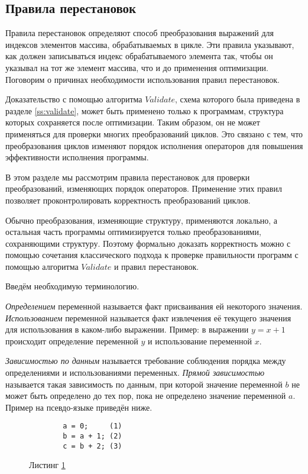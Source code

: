 \subsection{Правила перестановок}

Правила перестановок определяют способ преобразования выражений для индексов элементов массива, обрабатываемых в цикле. Эти правила указывают, как должен записываться индекс обрабатываемого элемента так, чтобы он указывал на тот же элемент массива, что и до применения оптимизации. Поговорим о причинах необходимости использования правил перестановок.

Доказательство с помощью алгоритма $Validate$, схема которого была приведена в разделе \ref{ss:validate}, может быть применено только к программам, структура которых сохраняется после оптимизации. Таким образом, он не может применяться для проверки многих преобразований циклов. Это связано с тем, что преобразования циклов изменяют порядок исполнения операторов для повышения эффективности исполнения программы.

В этом разделе мы рассмотрим правила перестановок для проверки преобразований, изменяющих порядок операторов. Применение этих правил позволяет проконтролировать корректность преобразований циклов.

Обычно преобразования, изменяющие структуру, применяются локально, а остальная часть программы оптимизируется только преобразованиями, сохраняющими структуру. Поэтому формально доказать корректность можно с помощью сочетания классического подхода к проверке правильности программ с помощью алгоритма $Validate$ и правил перестановок.

Введём необходимую терминологию.

\label{def-use}
\emph{Определением} переменной называется факт присваивания ей некоторого значения. \emph{Использованием} переменной называется факт извлечения её текущего значения для использования в каком-либо выражении. Пример: в выражении $y = x + 1$ происходит определение переменной $y$ и использование переменной $x$.

\emph{Зависимостью по данным} называется требование соблюдения порядка между определениями и использованиями переменных.
\emph{Прямой зависимостью} называется такая зависимость по данным, при которой значение переменной $b$ не может быть определено до тех пор, пока не определено значение переменной $a$. Пример на псевдо-языке приведён ниже.

\begin{figure}[h]
    \label{fig:direct-dependency}
    \begin{verbatim}
        a = 0;     (1)
        b = a + 1; (2)
        c = b + 2; (3)
    \end{verbatim}
    Листинг \ref{fig:direct-dependency}
\end{figure}

